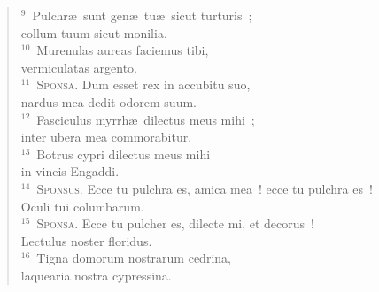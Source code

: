 \begin{flushleft}
\begin{verse}
${}^{9}$~Pulchr\ae\ sunt gen\ae\ tu\ae\ sicut turturis~;\\ collum tuum sicut monilia.\\
${}^{10}$~Murenulas aureas faciemus tibi,\\ vermiculatas argento.\\
${}^{11}$~\textsc{Sponsa.} Dum esset rex in accubitu suo,\\ nardus mea dedit odorem suum.\\
${}^{12}$~Fasciculus myrrh\ae\ dilectus meus mihi~;\\ inter ubera mea commorabitur.\\
${}^{13}$~Botrus cypri dilectus meus mihi\\ in vineis Engaddi.\\
${}^{14}$~\textsc{Sponsus.} Ecce tu pulchra es, amica mea~! ecce tu pulchra es~!\\ Oculi tui columbarum.\\
${}^{15}$~\textsc{Sponsa.} Ecce tu pulcher es, dilecte mi, et decorus~!\\ Lectulus noster floridus.\\
${}^{16}$~Tigna domorum nostrarum cedrina,\\ laquearia nostra cypressina.\end{verse}\end{flushleft}



